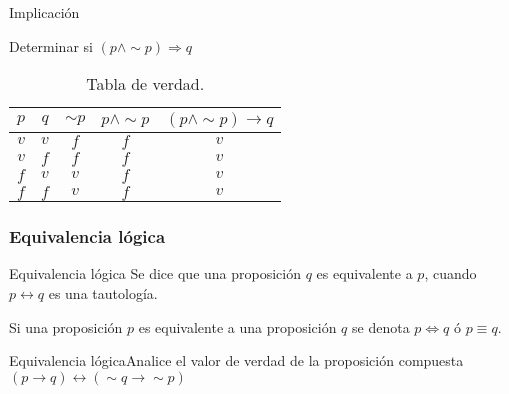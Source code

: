 \begin{ejem}{Implicación}

Determinar si $\left(p\wedge\sim p\right)\Rightarrow q$ \end{ejem}

\solucion 
\begin{table}[H]
\centering

\caption{Tabla de verdad.}


\begin{tabular}{c|c|c|c|c}
\arrayrulecolor{ptctitle}\cellcolor{ptctitle!50}$p$ & \cellcolor{ptctitle!50}$q$ & \cellcolor{ptctitle!50}$\sim p$ & \cellcolor{ptctitle!50}$p\wedge\sim p$ & \cellcolor{ptctitle!50}$\left(p\wedge\sim p\right)\rightarrow q$\tabularnewline
\hline 
\cellcolor{ptcbackground} $v$ & \cellcolor{ptcbackground}$v$ & \cellcolor{ptcbackground}$f$ & \cellcolor{ptcbackground}$f$ & \cellcolor{ptcbackground}$v$\tabularnewline
\hline 
\cellcolor{gray!50}$v$ & \cellcolor{gray!50} $f$ & \cellcolor{gray!50}$f$ & \cellcolor{gray!50}$f$ & \cellcolor{gray!50}$v$\tabularnewline
\hline 
\cellcolor{ptcbackground}$f$ & \cellcolor{ptcbackground} $v$ & \cellcolor{ptcbackground} $v$ & \cellcolor{ptcbackground}$f$ & \cellcolor{ptcbackground}$v$\tabularnewline
\hline 
\cellcolor{gray!50} $f$ & \cellcolor{gray!50} $f$ & \cellcolor{gray!50} $v$ & \cellcolor{gray!50}$f$ & \cellcolor{gray!50}$v$\tabularnewline
\hline 
\end{tabular}
\end{table}



\subsubsection{Equivalencia lógica}

\begin{definicionn}{Equivalencia lógica} Se dice que una proposición
$q$ es equivalente a $p$, cuando $p\leftrightarrow q$ es una tautología.\end{definicionn}

\notacion  Si una proposición $p$ es equivalente a una proposición
$q$ se denota $p\Leftrightarrow q$ ó $p\equiv q.$

\begin{ejem}{Equivalencia lógica}Analice el valor de verdad de la
proposición compuesta \ensuremath{(p\rightarrow q)\leftrightarrow(\sim q\rightarrow\sim p)}
\end{ejem}

\solucion

